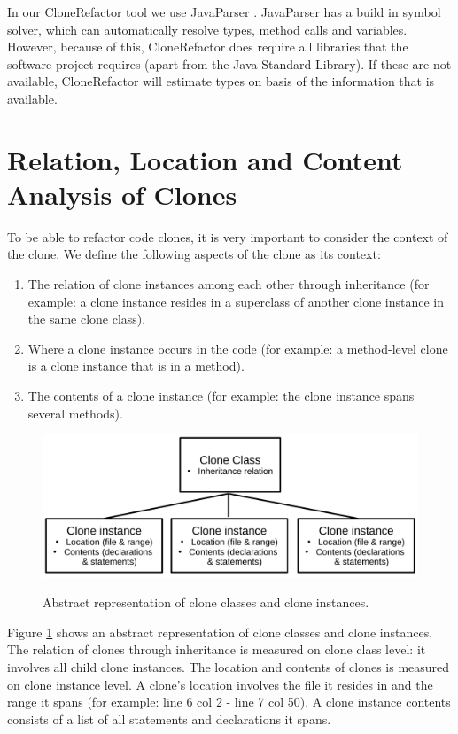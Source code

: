 \documentclass[a4paper]{article}
\begin{document}
In our CloneRefactor tool we use JavaParser \cite{tomassetti2017javaparser}. JavaParser has a build in symbol solver, which can automatically resolve types, method calls and variables. However, because of this, CloneRefactor does require all libraries that the software project requires (apart from the Java Standard Library). If these are not available, CloneRefactor will estimate types on basis of the information that is available.

\section{Relation, Location and Content Analysis of Clones}\label{chap:clonecontextexpl}
To be able to refactor code clones, it is very important to consider the context of the clone. We define the following aspects of the clone as its context:
\begin{enumerate}
  \item The relation of clone instances among each other through inheritance (for example: a clone instance resides in a superclass of another clone instance in the same clone class).
  \item Where a clone instance occurs in the code (for example: a method-level clone is a clone instance that is in a method).
  \item The contents of a clone instance (for example: the clone instance spans several methods).
\end{enumerate}

\begin{figure}[H]
  \caption{Abstract representation of clone classes and clone instances.}
    \medskip
    \includegraphics[width=1\columnwidth]{img/context}
  \label{fig:clonecontext}
\end{figure}

Figure \ref{fig:clonecontext} shows an abstract representation of clone classes and clone instances. The relation of clones through inheritance is measured on clone class level: it involves all child clone instances. The location and contents of clones is measured on clone instance level. A clone's location involves the file it resides in and the range it spans (for example: line 6 col 2 - line 7 col 50). A clone instance contents consists of a list of all statements and declarations it spans.
\end{document}
